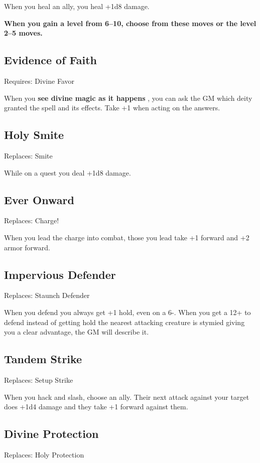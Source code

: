  When you heal an ally, you heal +1d8 damage.


\vspace{\baselineskip}
{\bfseries When you gain a level from 6--10, choose from these moves or the level 2--5 moves.}
\subsection{Evidence of Faith}


 Requires: Divine Favor


 When you \textbf{see divine magic as it happens}
, you can ask the GM which deity granted the spell and its effects. Take +1 when acting on the answers.
\subsection{Holy Smite}


 Replaces: Smite


 While on a quest you deal +1d8 damage.
\subsection{Ever Onward}


 Replaces: Charge!


 When you lead the charge into combat, those you lead take +1 forward and +2 armor forward.
\subsection{Impervious Defender}


 Replaces: Staunch Defender


 When you defend you always get +1 hold, even on a 6-. When you get a 12+ to defend instead of getting hold the nearest attacking creature is stymied giving you a clear advantage, the GM will describe it.
\subsection{Tandem Strike}


 Replaces: Setup Strike


 When you hack and slash, choose an ally. Their next attack against your target does +1d4 damage and they take +1 forward against them.
\subsection{Divine Protection}


 Replaces: Holy Protection


